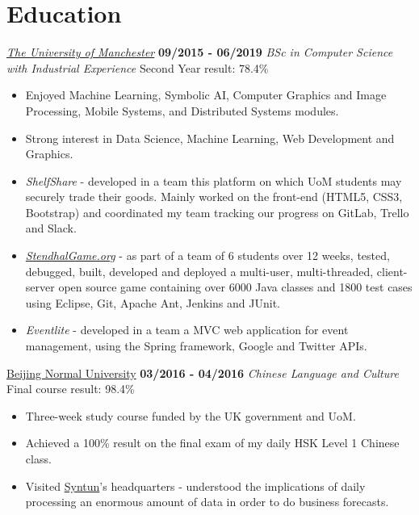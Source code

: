 \documentclass[]{friggeri-cv}
\begin{document}
\section{\color{red}Edu\color{gray}cation}
\begin{entrylist}
  \entry
    {}
    {\emph{\href{http://www.manchester.ac.uk/}{The University of Manchester}}}
    {\textbf{09/2015 - 06/2019}}
    {\emph{BSc in Computer Science with Industrial Experience}}
    {Second Year result: 78.4\%}
    \begin{itemize}
        \item Enjoyed Machine Learning, Symbolic AI, Computer Graphics and Image Processing, Mobile Systems, and Distributed Systems modules.
        \item Strong interest in Data Science, Machine Learning, Web Development and Graphics.
        \item \emph{ShelfShare} - developed in a team this platform on which UoM students may securely trade their goods. Mainly worked on the front-end (HTML5, CSS3, Bootstrap) and coordinated my team tracking our progress on GitLab, Trello and Slack.
        \item \emph{\href{https://stendhalgame.org/}{StendhalGame.org}} - as part of a team of 6 students over 12 weeks, tested, debugged, built, developed and deployed a multi-user, multi-threaded, client-server open source game containing over 6000 Java classes and 1800 test cases using Eclipse, Git, Apache Ant, Jenkins and JUnit.
        \item \emph{Eventlite} - developed in a team a MVC web application for event management, using the Spring framework, Google and Twitter APIs.\\
    \end{itemize}
  \entry
    {}
    {\href{http://english.bnu.edu.cn/}{Beijing Normal University}}
    {\textbf{03/2016 - 04/2016}}
    {\emph{Chinese Language and Culture}}
    {Final course result: 98.4\%}
    \begin{itemize}
        \item Three-week study course funded by the UK government and UoM.
        \item Achieved a 100\% result on the final exam of my daily HSK Level 1 Chinese class.
        \item Visited \href{http://www.syntun.com/}{Syntun}'s headquarters - understood the implications of daily processing an enormous amount of data in order to do business forecasts.\\
    \end{itemize}

\end{entrylist}
\end{document}
